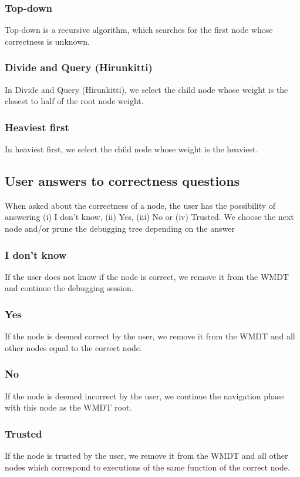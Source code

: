 \subsubsection{Top-down}
Top-down is a recursive algorithm, which searches for the first node whose correctness is unknown.

\subsubsection{Divide and Query (Hirunkitti)}
In Divide and Query (Hirunkitti), we select the child node whose weight is the closest to half of the root node weight.

\subsubsection{Heaviest first}
In heaviest first, we select the child node whose weight is the heaviest.

\subsection{User answers to correctness questions}
\label{implementation:correctnessAnswers}
When asked about the correctness of a node, the user has the possibility of answering (i) I don't know, (ii) Yes, (iii) No or (iv) Trusted.
We choose the next node and/or prune the debugging tree depending on the answer
\subsubsection{I don't know}
If the user does not know if the node is correct, we remove it from the WMDT and continue the debugging session.
\subsubsection{Yes}
If the node is deemed correct by the user, we remove it from the WMDT and all other nodes equal to the correct node.

\subsubsection{No}
If the node is deemed incorrect by the user, we continue the navigation phase with this node as the WMDT root.
\subsubsection{Trusted}
If the node is trusted by the user, we remove it from the WMDT and all other nodes which correspond to executions of the same function of the correct node.


